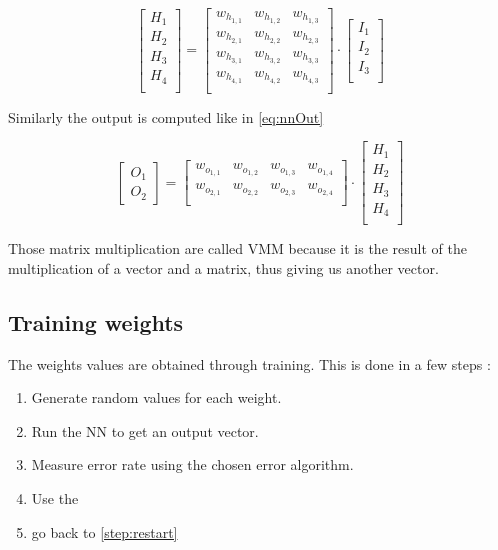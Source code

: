 \begin{equation}\label{eq:nnHid}
  \begin{bmatrix}
    H_1\\ H_2\\ H_3\\ H_4\\
  \end{bmatrix}
  =
  \begin{bmatrix}
    w_h_{1,1} & w_h_{1,2} & w_h_{1,3}\\
    w_h_{2,1} & w_h_{2,2} & w_h_{2,3}\\
    w_h_{3,1} & w_h_{3,2} & w_h_{3,3}\\
    w_h_{4,1} & w_h_{4,2} & w_h_{4,3}\\
  \end{bmatrix}
  \cdot
  \begin{bmatrix}
    I_1\\ I_2\\ I_3\\
  \end{bmatrix}
\end{equation}

Similarly the output is computed like in \cref{eq:nnOut}

\begin{equation}\label{eq:nnOut}
  \begin{bmatrix}
    O_1\\ O_2
  \end{bmatrix}
  =
  \begin{bmatrix}
    w_o_{1,1} & w_o_{1,2} & w_o_{1,3} & w_o_{1,4}\\
    w_o_{2,1} & w_o_{2,2} & w_o_{2,3} & w_o_{2,4}\\
  \end{bmatrix}
  \cdot
  \begin{bmatrix}
    H_1\\ H_2\\ H_3\\ H_4\\
  \end{bmatrix}
\end{equation}

Those matrix multiplication are called \ac{VMM} because it is the result of the multiplication of a vector and a matrix, thus giving us another vector.

\subsection{Training weights}

The weights values are obtained through training. This is done in a few steps :

\begin{enumerate}
  \item Generate random values for each weight.
  \item Run the \ac{NN} to get an output vector.\label{step:restart}
  \item Measure error rate using the chosen error algorithm.
  \item Use the
  \item go back to \cref{step:restart}
\end{enumerate}
